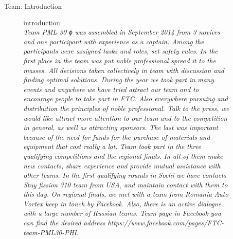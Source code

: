 \large Team:
\large  Introduction
	\begin{figure}[H]
		introduction\\
		\emph{Team PML 30 ϕ was assembled in September 2014 from 3 novices and one participant with experience as a captain. Among the participants were assigned tasks and roles, 			set safety rules. In the first place in the team was put noble professional spread it to the masses.  All decisions taken collectively in team with discussion and finding optimal 				solutions.
		During the year we took part in many events and anywhere we have tried attract our team and to encourage people to take part in FTC. Also everywhere pursuing and 				distribution the principles of noble professional. Talk to the press, we would like attract more attention to our team and to the competition in general, as well as attracting 				sponsors. The last was important because of the need for funds for the purchase of materials and equipment that cost really a lot.
		Team took part in the three qualifying competitions and the regional finals. In all of them make new contacts, share experience and provide mutual assistance with other teams. 
		In the first qualifying rounds in Sochi we have contacts Stuy  fission 310 team from USA, and maintain contact with them to this day. On regional finals, we met with a team from 			Romania Auto Vortex keep in touch by Facebook. Also, there is an active dialogue with a large number of Russian teams. Team page in Facebook you can find the desired address 			https://www.facebook.com/pages/FTC-team-PML30-PHI.
}
 
\end{figure}
